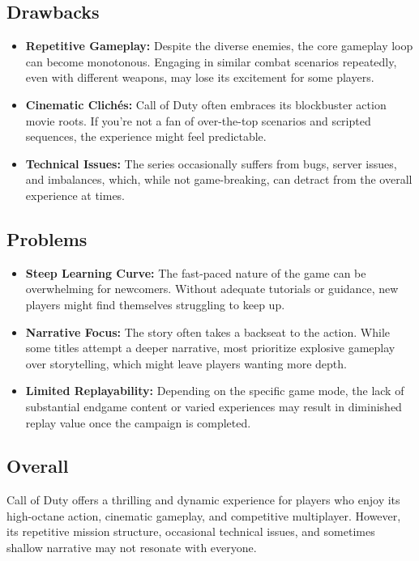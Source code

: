 \subsection{Drawbacks}
\begin{itemize}
	\item \textbf{Repetitive Gameplay:} Despite the diverse enemies, the core gameplay loop can become monotonous. Engaging in similar combat scenarios repeatedly, even with different weapons, may lose its excitement for some players.
	\item \textbf{Cinematic Clichés:} Call of Duty often embraces its blockbuster action movie roots. If you’re not a fan of over-the-top scenarios and scripted sequences, the experience might feel predictable.
	\item \textbf{Technical Issues:} The series occasionally suffers from bugs, server issues, and imbalances, which, while not game-breaking, can detract from the overall experience at times.
\end{itemize}

\subsection{Problems}
\begin{itemize}
	\item \textbf{Steep Learning Curve:} The fast-paced nature of the game can be overwhelming for newcomers. Without adequate tutorials or guidance, new players might find themselves struggling to keep up.
	\item \textbf{Narrative Focus:} The story often takes a backseat to the action. While some titles attempt a deeper narrative, most prioritize explosive gameplay over storytelling, which might leave players wanting more depth.
	\item \textbf{Limited Replayability:} Depending on the specific game mode, the lack of substantial endgame content or varied experiences may result in diminished replay value once the campaign is completed.
\end{itemize}
\subsection{Overall}
Call of Duty offers a thrilling and dynamic experience for players who enjoy its high-octane action, cinematic gameplay, and competitive multiplayer. However, its repetitive mission structure, occasional technical issues, and sometimes shallow narrative may not resonate with everyone.

